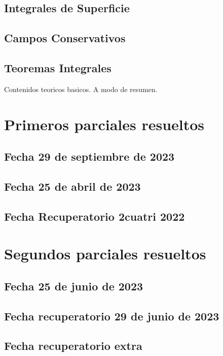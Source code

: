 \documentclass[10pt, a4paper]{report}
\theoremstyle{definition} %
\begin{document}
        \section{Integrales de Superficie}
        \section{Campos Conservativos}

            
        \section{Teoremas Integrales}

        Contenidos teoricos basicos. A modo de resumen. 

    \chapter{Primeros parciales resueltos}
        \section{Fecha 29 de septiembre de 2023}
            

        \newpage
        \section{Fecha 25 de abril de 2023}
            

        \newpage
        \section{Fecha Recuperatorio 2cuatri 2022}
            


        \newpage
    \chapter{Segundos parciales resueltos}
        \section{Fecha 25 de junio de 2023}
            

        \newpage
        \section{Fecha recuperatorio 29 de junio de 2023}
            

        \newpage
        \section{Fecha recuperatorio extra}
            
    
\end{document}
